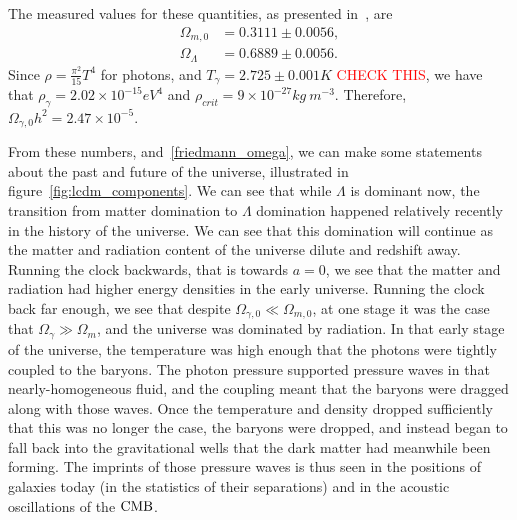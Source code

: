     The measured values for these quantities, as presented in~\cite{Planck_parameters_2018},
    are
    \begin{align}\label{measured_params}
        \Omega_{m,0} &= 0.3111 \pm 0.0056,\\
        \Omega_{\Lambda} &=  0.6889 \pm 0.0056.
    \end{align}
    Since
    $\rho = \frac{\pi^2}{15}T^4$
    for photons, and $T_{\gamma}=2.725\pm0.001K$ \textcolor{red}{CHECK THIS},
    we have that $\rho_{\gamma}=2.02\times 10^{-15} eV^4$
    and $\rho_{crit}=9\times 10^{-27} kg~m^{-3}$.
    Therefore, $\Omega_{\gamma,0}h^2=2.47\times 10^{-5}$.


    From these numbers, and~\eqref{friedmann_omega}, we can make some statements
    about the past and future of the universe, illustrated in figure~\ref{fig:lcdm_components}.
    We can see that while $\Lambda$ is dominant now, the transition from matter domination
    to $\Lambda$ domination happened relatively recently in the history of the universe.
    We can see that this domination will continue as the matter and radiation content of the
    universe dilute and redshift away.
    Running the clock backwards, that is towards $a=0$, we see that the matter and radiation had
    higher energy densities in the early universe. Running the clock back far enough, we see
    that despite $\Omega_{\gamma,0}\ll\Omega_{m,0}$, at one stage it was the
    case that $\Omega_{\gamma}\gg\Omega_{m}$, and the universe was dominated by radiation.
    In that early stage of the universe, the temperature was high enough that the photons
    were tightly coupled to the baryons. The photon pressure supported pressure waves in that
    nearly-homogeneous fluid, and the coupling meant that the baryons were dragged along with those
    waves. Once the temperature and density dropped sufficiently that this was no longer the case,
    the baryons were dropped, and instead began to fall back into the gravitational wells that the dark matter
    had meanwhile been forming. The imprints of those pressure waves is thus seen in the positions
    of galaxies today (in the statistics of their separations) and in the acoustic oscillations of the $\text{CMB}$.


